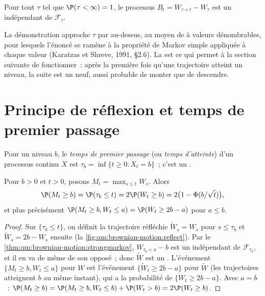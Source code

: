 \begin{theorem}\label{thm:qm:brownian-motion:strongmarkov}
Pour tout  $\tau$ tel que $\P(\tau < \infty) = 1$, le processus $B_t = W_{\tau + t} -
W_\tau$ est un  indépendant de $\mathcal F_\tau$.
\end{theorem}

\admitted

La démonstration approche $\tau$ par au-dessus, au moyen de  à valeurs dénombrables, pour
lesquels l'énoncé se ramène à la propriété de Markov simple appliquée à chaque valeur (Karatzas et
Shreve, 1991, §2.6). La  est ce qui permet à la section suivante de fonctionner~: après
la première fois qu'une trajectoire atteint un niveau, la suite est un  neuf, aussi
probable de monter que de descendre.

\section{Principe de réflexion et temps de premier passage}

\begin{definition}\label{def:qm:brownian-motion:passage}
Pour un niveau $b$, le \emph{temps de premier passage} (ou \emph{temps
d'atteinte}) d'un processus continu $X$ est $\tau_b = \inf\{t \ge 0 : X_t = b\}$~;
c'est un .
\end{definition}

\begin{theorem}\label{thm:qm:brownian-motion:reflection}
Pour $b > 0$ et $t > 0$, posons $M_t = \max_{s \le t}W_s$. Alors
\[
\P(M_t \ge b) = \P(\tau_b \le t) = 2\P(W_t \ge b) = 2\bigl(1 - \Phi(b/\sqrt t)\bigr),
\]
et plus précisément $\P(M_t \ge b, W_t \le a) = \P(W_t \ge 2b - a)$ pour $a \le b$.
\end{theorem}

\begin{proof}
Sur $\{\tau_b \le t\}$, on définit la trajectoire réfléchie $\tilde W_s = W_s$ pour $s \le \tau_b$ et $\tilde
W_s = 2b - W_s$ ensuite (la \cref{fig:qm:brownian-motion:reflect}). Par
le \cref{thm:qm:brownian-motion:strongmarkov}, $W_{\tau_b + u} - b$ est un 
indépendant de $\mathcal F_{\tau_b}$, et il en va de même de son opposé~; donc $\tilde W$ est un
. L'événement $\{M_t \ge b, W_t \le a\}$ pour $W$ est l'événement $\{\tilde W_t \ge 2b - a\}$ pour
$\tilde W$ (les trajectoires atteignent $b$ au même instant), qui a la probabilité de $\{W_t \ge 2b -
a\}$. Avec $a = b$~: $\P(M_t \ge b) = \P(M_t \ge b, W_t \le b) + \P(W_t > b) = 2\P(W_t \ge b)$.
\end{proof}

